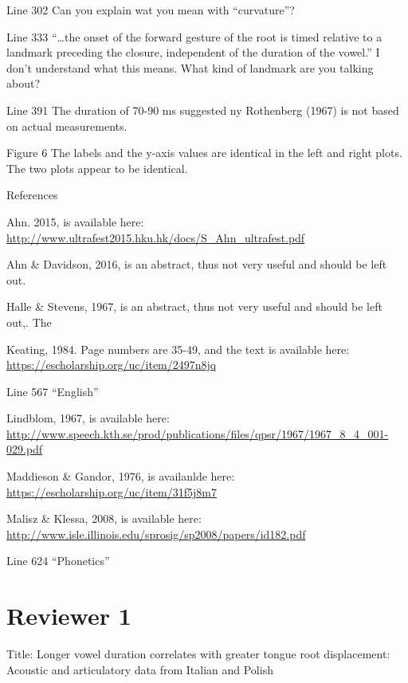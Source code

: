 \documentclass[]{article}
\begin{document}
Line 302 Can you explain wat you mean with ``curvature''?

Line 333 ``\ldots{}the onset of the forward gesture of the root is timed
relative to a landmark preceding the closure, independent of the
duration of the vowel.'' I don't understand what this means. What kind
of landmark are you talking about?

Line 391 The duration of 70-90 ms suggested ny Rothenberg (1967) is not
based on actual measurements.

Figure 6 The labels and the y-axis values are identical in the left and
right plots. The two plots appear to be identical.

References

Ahn. 2015, is available here:
\url{http://www.ultrafest2015.hku.hk/docs/S_Ahn_ultrafest.pdf}

Ahn \& Davidson, 2016, is an abstract, thus not very useful and should
be left out.

Halle \& Stevens, 1967, is an abstract, thus not very useful and should
be left out,. The

Keating, 1984. Page numbers are 35-49, and the text is available here:
\url{https://escholarship.org/uc/item/2497n8jq}

Line 567 ``English''

Lindblom, 1967, is available here:
\url{http://www.speech.kth.se/prod/publications/files/qpsr/1967/1967_8_4_001-029.pdf}

Maddieson \& Gandor, 1976, is availanlde here:
\url{https://escholarship.org/uc/item/31f5j8m7}

Malisz \& Klessa, 2008, is available here:
\url{http://www.isle.illinois.edu/sprosig/sp2008/papers/id182.pdf}

Line 624 ``Phonetics''

\hypertarget{reviewer-1}{%
\section{Reviewer 1}\label{reviewer-1}}

Title: Longer vowel duration correlates with greater tongue root
displacement: Acoustic and articulatory data from Italian and Polish
\end{document}
